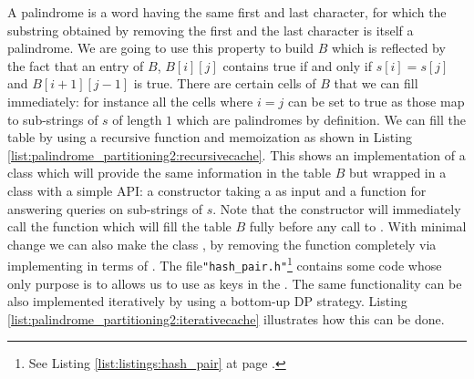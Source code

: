 A palindrome is a word having the same first and last character, for which the substring obtained by
removing the first and the last character is itself a palindrome. We are going to use this property
to build $B$ which is reflected by the fact that an entry of $B$, $B[i][j]$ contains true if and
only if $s[i]=s[j]$ and $B[i+1][j-1]$ is true. There are certain cells of $B$ that we can fill
immediately: for instance all the cells where $i=j$ can be set to true as those map to sub-strings
of $s$ of length $1$ which are palindromes by definition. We can fill the table by using a  recursive
function and memoization as shown in Listing \ref{list:palindrome_partitioning2:recursivecache}.
This shows an implementation of a class which will provide the same information in the table $B$ but
wrapped in a class with a simple API: a constructor taking a  as input and a
function  for answering queries on
sub-strings of $s$. Note that the constructor will immediately call the function 
which will fill the table $B$ fully before any call to . With minimal change
we can also make the class , by removing the
 function completely via implementing  in terms of
. The file\texttt{"hash\_pair.h"}\footnote{See Listing
\ref{list:listings:hash_pair} at page \pageref{list:listings:hash_pair}.} contains some code whose
only purpose is to allows us to use  as keys in the
. The same functionality can be also implemented iteratively by using a bottom-up DP strategy. Listing
\ref{list:palindrome_partitioning2:iterativecache} illustrates how this can be done.






